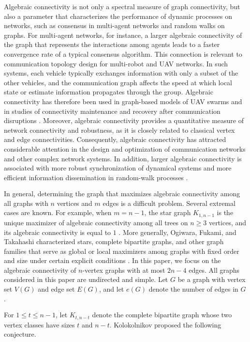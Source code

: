 \documentclass[11pt]{article}
\theoremstyle{definition}
\begin{document}
Algebraic connectivity is not only a spectral measure of graph connectivity, but also a parameter that characterizes the performance of dynamic processes on networks, such as consensus in multi-agent networks and random walks on graphs. For multi-agent networks, for instance, a larger algebraic connectivity of the graph that represents the interactions among agents leads to a faster convergence rate of a typical consensus algorithm\cite{OM04}. This connection is relevant to communication topology design for multi-robot and UAV networks. In such systems, each vehicle typically exchanges information with only a subset of the other vehicles, and
the communication graph affects the speed at which local state or estimate information propagates through the group. Algebraic
connectivity has therefore been used in graph-based models of UAV swarms and in studies of connectivity maintenance and recovery after communication disruptions \cite{WAE16,WangUAV18,HuUAV25}.
Moreover, algebraic connectivity provides a quantitative measure of network connectivity and robustness, as it is closely related to classical vertex and edge connectivities. Consequently, algebraic connectivity has attracted considerable attention in the design and optimization of communication networks and other complex network systems. In addition, larger algebraic connectivity is associated with more robust synchronization of dynamical systems and more efficient information dissemination in random-walk processes \cite{OFT17}.



In general, determining the graph that maximizes algebraic connectivity among all graphs with $n$ vertices and $m$ edges is a difficult problem. Several extremal cases are known. For example, when $m=n-1$, the star graph $K_{1,n-1}$ is the unique maximizer of algebraic connectivity among all trees on $n\geq 3$ vertices, and its algebraic connectivity is equal to $1$ \cite{GMS90}. More generally, Ogiwara, Fukami, and Takahashi characterized stars, complete bipartite graphs, and other graph families that serve as global or local maximizers among graphs with fixed order and size under certain explicit conditions \cite{OFT17}. In this paper, we focus on the algebraic connectivity of $n$-vertex graphs with at most $2n-4$ edges. All graphs considered in this paper are undirected and simple. Let $G$ be a graph with vertex set $V(G)$ and edge set $E(G)$, and let $e(G)$ denote the number of edges in $G$.


For $1\leq t\leq n-1$, let $K_{t,n-t}$ denote the complete bipartite graph whose two vertex classes have sizes $t$ and $n-t$. Kolokolnikov proposed the following conjecture.
\end{document}

